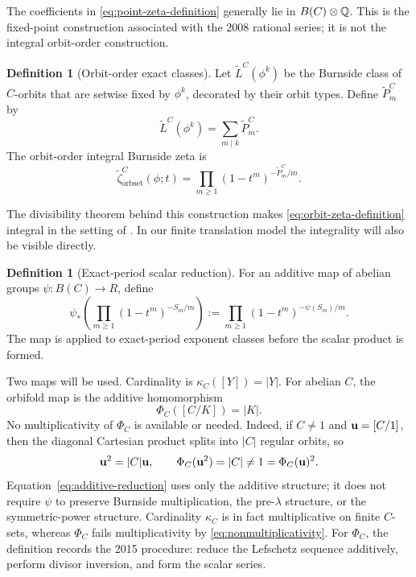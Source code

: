 \documentclass[11pt]{article}
\theoremstyle{definition}
\newtheorem{definition}[theorem]{Definition}
\theoremstyle{remark}
\begin{document}
The coefficients in \eqref{eq:point-zeta-definition} generally lie in
\(B(C)\otimes\mathbb{Q}\).  This is the fixed-point construction associated with the
2008 rational series; it is not the integral orbit-order construction.

\begin{definition}[Orbit-order exact classes]
Let \(\widetilde L^C(\phi^k)\) be the Burnside class of \(C\)-orbits that are
setwise fixed by \(\phi^k\), decorated by their orbit types.  Define
\(\widetilde P_m^C\) by
\begin{equation}
  \widetilde L^C(\phi^k)=\sum_{m\mid k}\widetilde P_m^C.
  \label{eq:orbit-inversion}
\end{equation}
The orbit-order integral Burnside zeta is
\begin{equation}
  \widetilde\zeta_{\mathrm{orbset}}^C(\phi;t)
  =\prod_{m\ge1}(1-t^m)^{-\widetilde P_m^C/m}.
  \label{eq:orbit-zeta-definition}
\end{equation}
\end{definition}

The divisibility theorem behind this construction makes
\eqref{eq:orbit-zeta-definition} integral in the setting of
\citet{GuseinZadeLuengoMelle2015}.  In our finite translation model the
integrality will also be visible directly.

\begin{definition}[Exact-period scalar reduction]
For an additive map of abelian groups \(\psi\colon B(C)\to R\), define
\begin{equation}
  \psi_*\!\left(\prod_{m\ge1}(1-t^m)^{-S_m/m}\right)
  :=\prod_{m\ge1}(1-t^m)^{-\psi(S_m)/m}.
  \label{eq:additive-reduction}
\end{equation}
The map is applied to exact-period exponent classes before the scalar product
is formed.
\end{definition}

Two maps will be used.  Cardinality is
\(\kappa_C([Y])=|Y|\).  For abelian \(C\), the orbifold map is the additive
homomorphism
\begin{equation}
  \Phi_C([C/K])=|K|.
  \label{eq:orbifold-map}
\end{equation}
No multiplicativity of \(\Phi_C\) is available or needed.  Indeed, if
\(C\ne1\) and \(\mathbf{u}=[C/1]\), then the diagonal Cartesian product splits
into \(|C|\) regular orbits, so
\begin{equation}
  \mathbf{u}^2=|C|\mathbf{u},
  \qquad
  \Phi_C(\mathbf{u}^2)=|C|\ne1=\Phi_C(\mathbf{u})^2.
  \label{eq:nonmultiplicativity}
\end{equation}
Equation~\eqref{eq:additive-reduction} uses only the additive structure; it
does not require \(\psi\) to preserve Burnside multiplication, the
pre-\(\lambda\) structure, or the symmetric-power structure.  Cardinality
\(\kappa_C\) is in fact multiplicative on finite \(C\)-sets, whereas
\(\Phi_C\) fails multiplicativity by \eqref{eq:nonmultiplicativity}.  For
\(\Phi_C\), the definition records the 2015 procedure: reduce the Lefschetz
sequence additively, perform divisor inversion, and form the scalar series.
\end{document}
